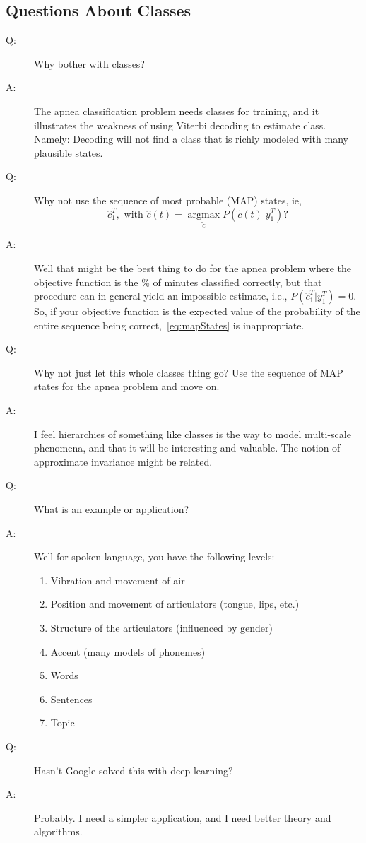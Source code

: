 \documentclass[]{article}
\newcommand{\ts}[3]{#1_{#2}^{#3}}                    %
\newcommand{\argmax}{\operatorname*{argmax}}
\newcommand{\ti}[2]{{#1}{(#2)}}                  %
\newcommand{\ie}{i.e.\xspace}
\begin{document}
\subsection{Questions About Classes}
\label{sec:questions}

\begin{description}
\item[Q:] Why bother with classes?
\item[A:] The apnea classification problem needs classes for training,
  and it illustrates the weakness of using Viterbi decoding to
  estimate class.  Namely: Decoding will not find a class that is
  richly modeled with many plausible states.
\item[Q:] Why not use the sequence of most probable (MAP) states, ie,
  \begin{equation}
    \label{eq:mapStates}
    \ts{\hat{c}}{1}{T}, \text{ with } \ti{\hat{c}}{t} = \argmax_{\tilde{c}}
    P \left(\ti{\tilde{c}}{t}|\ts{y}{1}{T} \right)?
  \end{equation}
\item[A:] Well that might be the best thing to do for the apnea
  problem where the objective function is the \% of minutes classified
  correctly, but that procedure can in general yield an impossible
  estimate, \ie, $P(\ts{\hat{c}}{1}{T}|\ts{y}{1}{T}) = 0$.  So, if
  your objective function is the expected value of the probability of
  the entire sequence being correct,~\eqref{eq:mapStates} is
  inappropriate.
\item[Q:] Why not just let this whole classes thing go?  Use the
  sequence of MAP states for the apnea problem and move on.
\item[A:] I feel hierarchies of something like classes is the way to
  model multi-scale phenomena, and that it will be interesting and
  valuable.  The notion of approximate invariance might be related.
\item[Q:] What is an example or application?
\item[A:] Well for spoken language, you have the following levels:
  \begin{enumerate}
  \item Vibration and movement of air
  \item Position and movement of articulators (tongue, lips, etc.)
  \item Structure of the articulators (influenced by gender)
  \item Accent (many models of phonemes)
  \item Words
  \item Sentences
  \item Topic
  \end{enumerate}
\item[Q:] Hasn't Google solved this with deep learning?
\item[A:] Probably.  I need a simpler application, and I need better
  theory and algorithms.
\end{description}
\end{document}
